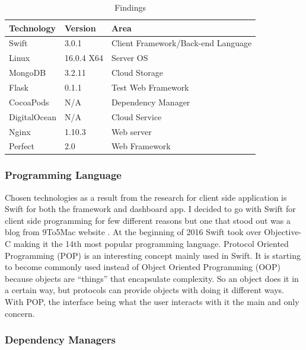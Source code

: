 \begin{table}[!h]
\centering
\caption{Findings}
\label{my-label}
\begin{tabular}{|l|l|l|}
\hline
\cellcolor{green!20}Technology & \cellcolor{green!20}Version  & \cellcolor{green!20}Area \\ \hline
Swift      & 3.0.1      & Client Framework/Back-end Language \\ \hline
Linux      & 16.0.4 X64 & Server OS                          \\ \hline
MongoDB    & 3.2.11     & Cloud Storage                      \\ \hline
Flask      & 0.1.1      & Test Web Framework                 \\ \hline
CocoaPods  & N/A        & Dependency Manager                 \\ \hline
DigitalOcean    & N/A     & Cloud Service               \\ \hline
Nginx            & 1.10.3       & Web server               \\ \hline
Perfect            & 2.0      & Web Framework               \\ \hline
\end{tabular}
\end{table}

\subsubsection{Programming Language}

Chosen technologies as a result from the research for client side application is Swift for both the framework and dashboard app. I decided to go with Swift for client side programming for few different reasons but one that stood out was a blog from 9To5Mac website \cite{webserver}. At the beginning of 2016 Swift took over Objective-C making it the 14th most popular programming language. Protocol Oriented Programming (POP) is an interesting concept mainly used in Swift. It is starting to become commonly used instead of Object Oriented Programming (OOP) because objects are “things” that encapsulate complexity. So an object does it in a certain way, but protocols can provide objects with doing it different ways. With POP, the interface being what the user interacts with it the main and only concern.

\subsubsection{Dependency Managers}

